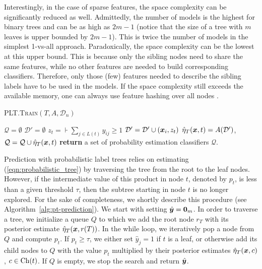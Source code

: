 \documentclass{article}
\newcommand{\cD}{\mathcal{D}}
\newcommand{\Algo}[1]{\textsc{#1}}
\begin{document}
Interestingly, in the case of sparse features, the space complexity can be significantly reduced as well. Admittedly, the number of models is the highest for binary trees and can be as high as $2m-1$ (notice that the size of a tree with $m$ leaves is upper bounded by $2m-1$). This is twice the number of models in the simplest 1-vs-all approach. Paradoxically, the space complexity can be the lowest at this upper bound. This is because only the sibling nodes need to share the same features, while no other features are needed to build corresponding classifiers. Therefore, only those (few) features needed to describe the sibling labels have to be used in the models. If the space complexity still exceeds the available memory, one can always use feature hashing over all nodes \cite{Weinberger_et_al_2009}.

%
\begin{algorithm}[t]
\caption{\Algo{PLT.Train}$(T, A, \cD_n)$}%
\label{alg:pt-learning}
\begin{algorithmic}[1]
\State $\mathcal{Q} = \emptyset$
\State $\cD' = \emptyset$
\State $z_t = \assert{\sum_{j \in L(t)} y_{ij} \ge 1 }$
\State $\cD' = \cD' \cup (\bx_i, z_t)$ 
\EndIf
\EndFor
\State $\heta_T(\bx,t) = A(\cD')$, $\mathcal{Q} = \mathcal{Q} \cup \hat{\eta}_T(\boldsymbol{x},t) $  
\EndFor
\State \textbf{return} a set of probability estimation classifiers $\mathcal{Q}$. 
\end{algorithmic}
\end{algorithm} 

Prediction with probabilistic label trees relies on estimating (\ref{eqn:probabilistic_tree}) by traversing the tree from the root to the leaf nodes. However, if the intermediate value of this product in node $t$, denoted by $p_t$, is less than a given threshold $\tau$, then the subtree starting in node $t$ is no longer explored. For the sake of completeness, we shortly describe this procedure (see Algorithm~\ref{alg:pt-prediction}). We start with setting $\hat{\boldsymbol{y}} = \boldsymbol{0}_m$. In order to traverse a tree, we initialize a queue $Q$ to which we add the root node $r_T$ with its posterior estimate $\hat{\eta}_T(\boldsymbol{x},r(T))$. In the while loop, we iteratively pop a node from $Q$ and compute $p_t$. If $p_t \ge \tau$, we either set $\hat{y}_j = 1$ if $t$ is a leaf, or otherwise add its child nodes to $Q$ with the value $p_t$ multiplied by their posterior estimates $\hat{\eta}_T(\boldsymbol{x}, c)$, $c \in \mathrm{Ch}(t)$. If $Q$ is empty, we stop the search and return $\hat{\boldsymbol{y}}$.
\end{document}
